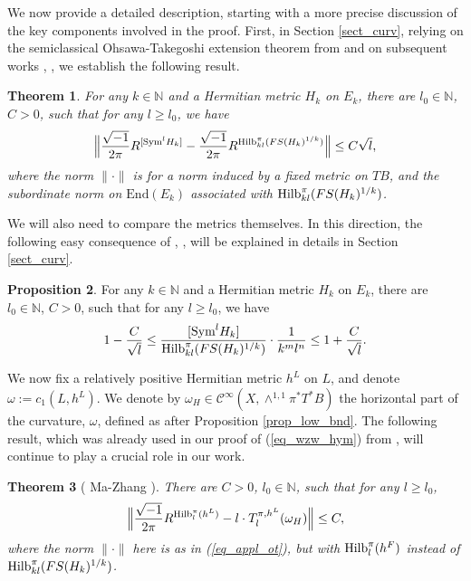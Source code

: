 \documentclass[12pt]{article}
\numberwithin{equation}{section}
\theoremstyle{theorem}
\newtheorem{thm}{Theorem}[section]
\theoremstyle{definition}
\newtheorem{prop}[thm]{Proposition}
\theoremstyle{remark}
\newcommand{\imun} {\sqrt{-1}}
\newcommand{\nat}{\mathbb{N}}
\newcommand{\enmr}[1]{\text{End}{(#1)}}
\newcommand{\ccal}{\mathscr{C}}
\begin{document}
	\par 
	We now provide a detailed description, starting with a more precise discussion of the key components involved in the proof.
	First, in Section \ref{sect_curv}, relying on the semiclassical Ohsawa-Takegoshi extension theorem from \cite{FinOTAs} and on subsequent works \cite{FinSecRing}, \cite{FinToeplImm}, we establish the following result.
	\par 
	\begin{thm}\label{thm_appl_ot}
		For any $k \in \nat$ and a Hermitian metric $H_k$ on $E_k$, there are $l_0 \in \nat$, $C > 0$, such that for any $l \geq l_0$, we have
		\begin{equation}\label{eq_appl_ot}
		\Big\|  
			\frac{\imun}{2 \pi} R^{[{\rm{Sym}}^l H_k]} - \frac{\imun}{2 \pi} R^{{\rm{Hilb}}_{kl}^{\pi}(FS(H_k)^{1/k})}
		\Big\| \leq C \sqrt{l},
		\end{equation}
		where the norm $\| \cdot \|$ is for a norm induced by a fixed metric on $TB$, and the subordinate norm on $\enmr{E_k}$ associated with ${\rm{Hilb}}_{kl}^{\pi}(FS(H_k)^{1/k})$.
	\end{thm}
	\par 
	We will also need to compare the metrics themselves. 
	In this direction, the following easy consequence of \cite{FinToeplImm}, \cite{FinOTRed}, will be explained in details in Section \ref{sect_curv}.
	\begin{prop}\label{thm_appl_ot2}
		For any $k \in \nat$ and a Hermitian metric $H_k$ on $E_k$, there are $l_0 \in \nat$, $C > 0$, such that for any $l \geq l_0$, we have
		\begin{equation}
			1 - \frac{C}{\sqrt{l}}
			\leq
			\frac{[{\rm{Sym}}^l H_k]}{{\rm{Hilb}}_{kl}^{\pi}(FS(H_k)^{1/k})} \cdot \frac{1}{k^m l^n}
			\leq
			1 + \frac{C}{\sqrt{l}}.
		\end{equation}
	\end{prop}
	\par 
	We now fix a relatively positive Hermitian metric $h^L$ on $L$, and denote $\omega := c_1(L, h^L)$.
	We denote by $\omega_H \in \ccal^{\infty}(X, \wedge^{1, 1} \pi^* T^* B)$ the horizontal part of the curvature, $\omega$, defined as after Proposition \ref{prop_low_bnd}.
	The following result, which was already used in our proof of (\ref{eq_wzw_hym}) from \cite{FinHNII}, will continue to play a crucial role in our work.
	\begin{thm}[{ Ma-Zhang \cite[Theorem 0.4]{MaZhangSuperconnBKPubl} }]\label{thm_mazh}
		There are $C > 0$, $l_0 \in \nat$, such that for any $l \geq l_0$,
		\begin{equation}
			\Big\|
				\frac{\imun}{2 \pi}
				R^{{\rm{Hilb}}_l^{\pi}(h^L)}
				-
				l \cdot T_l^{\pi, h^L}(\omega_H)
			\Big\|
			\leq
			C,
		\end{equation}
		where the norm $\| \cdot \|$ here is as in (\ref{eq_appl_ot}), but with ${\rm{Hilb}}_{l}^{\pi}(h^F)$ instead of ${\rm{Hilb}}_{kl}^{\pi}(FS(H_k)^{1/k})$.
	\end{thm}
\end{document}
